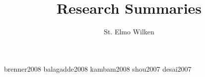 \documentclass[11pt,fleqn]{article}
\begin{document}
\title{Research Summaries}
\author{St. Elmo Wilken}
\maketitle

{brenner2008}
{balagadde2008}
{kambam2008}
{shou2007}
{desai2007}




\end{document}
